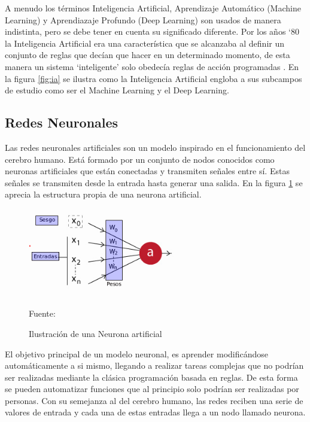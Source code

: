 A menudo los términos Inteligencia Artificial, Aprendizaje Automático (Machine Learning) y Aprendiazaje Profundo (Deep Learning) son usados de manera indistinta, pero se debe tener en cuenta su significado diferente. Por los años `80 la Inteligencia Artificial era una característica que se alcanzaba al definir un conjunto de reglas que decían que hacer en un determinado momento, de esta manera un sistema `inteligente' solo obedecía reglas de acción programadas \cite{researchgate:ia}. En la figura \ref{fig:ia} se ilustra como la Inteligencia Artificial engloba a sus subcampos de estudio como ser el Machine Learning y el Deep Learning.

\subsection{Redes Neuronales}
Las redes neuronales artificiales son un modelo inspirado en el funcionamiento del cerebro humano. Está formado por un conjunto de nodos conocidos como neuronas artificiales que están conectadas y transmiten señales entre sí. Estas señales se transmiten desde la entrada hasta generar una salida. En la figura \ref{fig:classical_ml} se aprecia la estructura propia de una neurona artificial.\\

\begin{figure}[H]
    \begin{center}
        \includegraphics[width=7cm]{img/capitulo_2/neurona.png}
        \caption{Ilustración de una Neurona artificial\\}
        Fuente: \cite{tensorflow_neurona}
    \label{fig:classical_ml}
    \end{center}
    
\end{figure}

El objetivo principal de un modelo neuronal, es aprender modificándose automáticamente a si mismo, llegando a realizar tareas complejas que no podrían ser realizadas mediante la clásica programación basada en reglas. De esta forma se pueden automatizar funciones que al principio solo podrían ser realizadas por personas. Con su semejanza al del cerebro humano, las redes reciben una serie de valores de entrada y cada una de estas entradas llega a un nodo llamado neurona.\\

